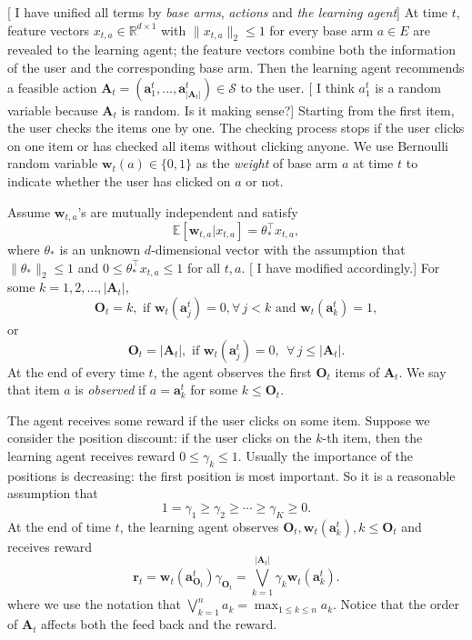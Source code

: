 \documentclass{article}
\newcommand{\EE}{\mathbb{E}}
\newcommand{\RR}{\mathbb{R}}
\newcommand{\bA}{\mathbf{A}}
\newcommand{\ba}{\mathbf{a}}
\newcommand{\bO}{\mathbf{O}}
\newcommand{\br}{\mathbf{r}}
\newcommand{\bw}{\mathbf{w}}
\newcommand{\cS}{\mathcal{S}}
\newcommand{\abs}[1]{\left| #1 \right|}
\newcommand{\norm}[1]{\| #1 \|}
\newcommand{\wei}[1]{}
\newcommand{\wei}[1]{{\color{blue!50!black}  [\text{Wei:} #1]}}
\newcommand{\shuai}[1]{{\color{brown!60!black} [\text{Shuai:} #1]}}
\begin{document}
\wei{We should unify terms, such as agent, user, player, etc. Also I suggest to refer to the agent as she, her.
Also for base arms, should we call them base arms, or items? their outcome as weights, or reward? It is fine to use up to two
terms interchangibly, but if so, we need to say it clearly at the first time the term is referred to.
Otherwise, we stick to one term.}
\shuai{I have unified all terms by {\em base arms}, {\em actions} and {\em the learning agent}}
At time $t$, feature vectors $x_{t,a} \in \RR^{d \times 1}$ with $\norm{x_{t,a}}_2 \leq 1$ for every base arm $a \in E$ are revealed to the learning agent; the feature vectors combine both the information of the user and the corresponding base arm. Then the learning agent recommends a feasible action $\bA_t=(\ba_{1}^t,...,\ba_{\abs{\bA_t}}^t) \in \cS$ to the user. 
\wei{Why using $\ba_{1}^t$, not $a_1^t$?} \shuai{I think $a_1^t$ is a random variable because $\bA_t$ is random. Is it making sense?}
Starting from the first item, the user checks the items one by one. The checking process stops if the user clicks on one item or has checked all items without clicking anyone. We use Bernoulli random variable $\bw_{t}(a) \in \{0,1\}$ as the {\em weight} of base arm $a$ at time $t$ to indicate whether the user has clicked on $a$ or not. 

Assume $\bw_{t,a}$'s are mutually independent and satisfy
\begin{equation}
\label{eq:expectation}
\EE[\bw_{t,a} | x_{t,a}] = \theta_{\ast}^{\top} x_{t,a},
\end{equation}
where $\theta_{\ast}$ is an unknown $d$-dimensional vector with the assumption that $\norm{\theta_{\ast}}_2 \leq 1$ and $0 \leq \theta_{\ast}^{\top} x_{t,a} \leq 1$ for all $t, a$. \wei{The above definition of $\bO_t$ looks indirect to me. What about "For some $k=1,2,\ldots, |\bA_t|$, $\bO_t = k$, if for all $j< k$, $\bw_t(\ba_j^t)=0$ and $\bw_t(\ba_k^t)=1$.} \shuai{I have modified accordingly.} For some $k=1,2,\ldots, \abs{\bA_t}$, 
$$
\bO_t = k, \text{ if } \bw_t(\ba_j^t)=0, \forall\, j < k \text{ and } \bw_t(\ba_k^t) = 1,
$$
or 
$$
\bO_t = \abs{\bA_t}, \text{ if }\bw_t(\ba_j^t) = 0, ~~ \forall\, j \leq \abs{\bA_t}.
$$
At the end of every time $t$, the agent observes the first $\bO_t$ items of $\bA_t$. We say that item $a$ is {\it observed} if $a = \ba_k^t$ for some $k \leq \bO_t$. 

The agent receives some reward if the user clicks on some item. Suppose we consider the position discount: if the user clicks on the $k$-th item, then the learning agent receives reward $0 \leq \gamma_k \leq 1$. Usually the importance of the positions is decreasing: the first position is most important. So it is a reasonable assumption that
$$
1 = \gamma_1 \geq \gamma_2 \geq \cdots \geq \gamma_K \geq 0.
$$
At the end of time $t$, the learning agent observes $\bO_t, \bw_t(\ba_k^t), k \leq \bO_t$ and receives reward
$$
\br_t = \bw_t(\ba_{\bO_t}^t) \gamma_{\bO_t} = \bigvee_{k=1}^{\abs{\bA_t}} \gamma_k \bw_t(\ba_k^t).
$$
where we use the notation that $\bigvee_{k=1}^n a_k = \max_{1 \leq k \leq n} a_k$. Notice that the order of $\bA_t$ affects both the feed back and the reward.
\end{document}
